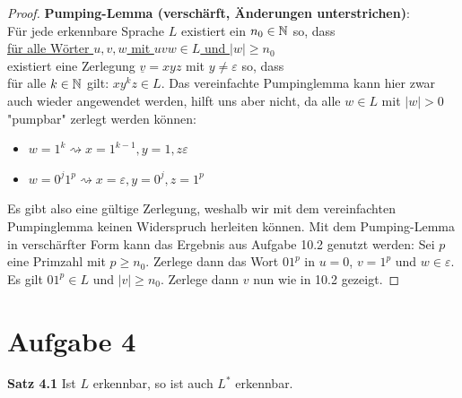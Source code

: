 \documentclass[12pt,a4paper]{article}
\begin{document}
\begin{proof}
	\textbf{Pumping-Lemma (verschärft, Änderungen unterstrichen)}:\\
	Für jede erkennbare Sprache $L$ existiert ein $n_0\in\mathbb{N}$ so, dass\\
	\underline{für alle Wörter $u,v,w$ mit $uvw\in L$ und $|w|\geq n_0$}\\
	existiert eine Zerlegung $\underline{v}=xyz$ mit $y\neq\varepsilon$ so, dass\\
	für alle $k\in\mathbb{N}$ gilt: $xy^kz\in L$.\nl
	Das vereinfachte Pumpinglemma kann hier zwar auch wieder angewendet werden, hilft uns aber nicht, da
	alle $w\in L$ mit $|w|>0$ "pumpbar" zerlegt werden können:
	\begin{itemize}
		\item $w=1^k\rightsquigarrow x=1^{k-1},y=1,z\varepsilon$
		\item $w=0^j 1^p\rightsquigarrow x=\varepsilon,y=0^j,z=1^p$
	\end{itemize}
	Es gibt also eine gültige Zerlegung, weshalb wir mit dem vereinfachten Pumpinglemma keinen Widerspruch herleiten können.
	Mit dem Pumping-Lemma in verschärfter Form kann das Ergebnis aus Aufgabe 10.2 genutzt werden:
	Sei $p$ eine Primzahl mit $p\geq n_0$. Zerlege dann das Wort $01^p$ in $u=0$, $v=1^p$ und $w\in\varepsilon$.
	Es gilt $01^p\in L$ und $|v|\geq n_0$.
	Zerlege dann $v$ nun wie in 10.2 gezeigt.
\end{proof}

\section*{Aufgabe 4}
\textbf{Satz 4.1} Ist $L$ erkennbar, so ist auch $L^\ast$ erkennbar.
\end{document}
